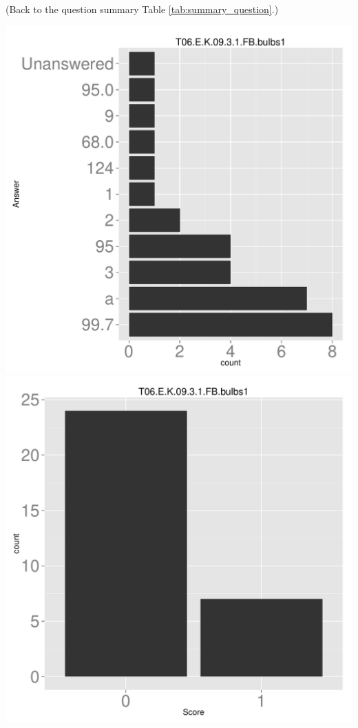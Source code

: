\documentclass[12pt,nohyper]{tufte-handout}\usepackage[]{graphicx}\usepackage[]{color}
\begin{document}
 (Back to the question summary Table \ref{tab:summary_question}.)

\begin{center} \includegraphics[width=.45\linewidth]{Topic06_33_answer} \includegraphics[width=.45\linewidth]{Topic06_33_score} \end{center} 
\end{document}

